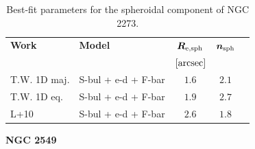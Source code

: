 \documentclass[preprint2]{emulateapj}
\begin{document}
  \begin{table}[h]
  \small
  \caption{Best-fit parameters for the spheroidal component of NGC 2273.}
  \begin{center}
  \begin{tabular}{llccc}
  \hline
  {\bf Work} & {\bf Model}   & $\bm R_{\rm e,sph}$    & $\bm n_{\rm sph}$ \\
    &  &  $[\rm arcsec]$ & \\
  \hline
  T.W. 1D maj. & S-bul + e-d + F-bar & $1.6$  &  $2.1$ \\
  T.W. 1D eq.  & S-bul + e-d + F-bar & $1.9$  &  $2.7$ \\
  \hline
  L+10         & S-bul + e-d + F-bar & $2.6$  &  $1.8$ \\
  \hline
  \end{tabular}
  \end{center}
  \label{tab:n2273}
  \end{table}

  \clearpage\newpage\noindent
  {\bf NGC 2549 \\}
  
\end{document}
